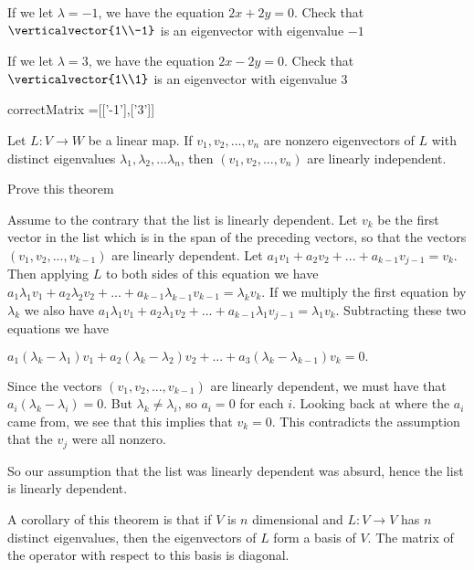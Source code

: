 \documentclass{ximera}
\begin{document}
\begin{question}
\begin{solution}
\begin{hint}
			If we let $\lambda = -1$, we have the equation $2x+2y=0$.  Check that $\verticalvector{1\\-1}$ is an eigenvector with eigenvalue $-1$
			
			If we let $\lambda = 3$, we have the equation $2x-2y=0$.  Check that $\verticalvector{1\\1}$ is an eigenvector with eigenvalue $3$

		\end{hint}
			\begin{matrix-answer}
			correctMatrix =[['-1'],['3']]
		\end{matrix-answer}
	\end{solution}
\end{question}

\begin{theorem}
	Let $L:V \to W$ be a linear map. If $v_1,v_2,...,v_n$ are nonzero eigenvectors of $L$ with distinct eigenvalues $\lambda_1,\lambda_2,...\lambda_n$, then $(v_1,v_2,...,v_n)$
	are linearly independent.
\end{theorem}

Prove this theorem

\begin{free-response}
	Assume to the contrary that the list is linearly dependent.  Let $v_k$ be the first vector in the list which is in the span of the preceding vectors, 
	so that the vectors $(v_1,v_2,...,v_{k-1})$  are linearly dependent.  
	Let $a_1v_1+a_2v_2+...+a_{k-1}v_{j-1} = v_k$.  Then applying $L$ to both sides of this equation we have
	$a_1\lambda_1 v_1+a_2\lambda_2 v_2+ ...+a_{k-1}\lambda_{k-1} v_{k-1} = \lambda_k v_k$.  If we multiply the first equation by $\lambda_k$ we also have
	$a_1\lambda_1v_1+a_2\lambda_1v_2+...+a_{k-1}\lambda_1v_{j-1} = \lambda_1v_k$.  Subtracting these two equations we have
	
	\(
		a_1(\lambda_k-\lambda_1)v_1+a_2(\lambda_k-\lambda_2)v_2+...+a_3(\lambda_k-\lambda_{k-1})v_k=0.
	\)
	
	Since the vectors   $(v_1,v_2,...,v_{k-1})$  are linearly dependent, we must have that $a_i(\lambda_k - \lambda_i) = 0$.  But $\lambda_k \neq \lambda_i$, so 
	$a_i=0$ for each $i$.  Looking back at where the $a_i$ came from, we see that this implies that $v_k=0$.  This contradicts the assumption that the $v_j$ were all nonzero.
	
	So our assumption that the list was linearly dependent was absurd, hence the list is linearly dependent.
	\end{free-response}
	
A corollary of this theorem is that if $V$ is $n$ dimensional and $L: V \to V$ has $n$ distinct eigenvalues, then the eigenvectors of $L$ form a basis of $V$.
The matrix of the operator with respect to this basis is diagonal.
	
\end{document}
